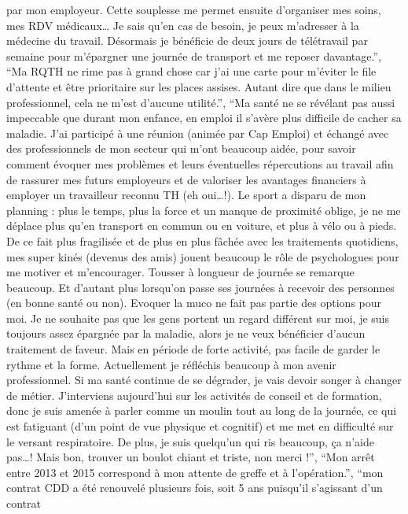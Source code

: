 \documentclass[
  letterpaper,
  DIV=11,
  numbers=noendperiod]{scrartcl}
\begin{document}
\begin{itemize}
  par mon employeur. Cette souplesse me permet ensuite d'organiser mes
  soins, mes RDV médicaux\ldots{} Je sais qu'en cas de besoin, je peux
  m'adresser à la médecine du travail. Désormais je bénéficie de deux
  jours de télétravail par semaine pour m'épargner une journée de
  transport et me reposer davantage.'', ``Ma RQTH ne rime pas à grand
  chose car j'ai une carte pour m'éviter le file d'attente et être
  prioritaire sur les places assises. Autant dire que dans le milieu
  professionnel, cela ne m'est d'aucune utilité.'', ``Ma santé ne se
  révélant pas aussi impeccable que durant mon enfance, en emploi il
  s'avère plus difficile de cacher sa maladie. J'ai participé à une
  réunion (animée par Cap Emploi) et échangé avec des professionnels de
  mon secteur qui m'ont beaucoup aidée, pour savoir comment évoquer mes
  problèmes et leurs éventuelles répercutions au travail afin de
  rassurer mes futurs employeurs et de valoriser les avantages
  financiers à employer un travailleur reconnu TH (eh oui\ldots!). Le
  sport a disparu de mon planning : plus le temps, plus la force et un
  manque de proximité oblige, je ne me déplace plus qu'en transport en
  commun ou en voiture, et plus à vélo ou à pieds. De ce fait plus
  fragilisée et de plus en plus fâchée avec les traitements quotidiens,
  mes super kinés (devenus des amis) jouent beaucoup le rôle de
  psychologues pour me motiver et m'encourager. Tousser à longueur de
  journée se remarque beaucoup. Et d'autant plus lorsqu'on passe ses
  journées à recevoir des personnes (en bonne santé ou non). Evoquer la
  muco ne fait pas partie des options pour moi. Je ne souhaite pas que
  les gens portent un regard différent sur moi, je suis toujours assez
  épargnée par la maladie, alors je ne veux bénéficier d'aucun
  traitement de faveur. Mais en période de forte activité, pas facile de
  garder le rythme et la forme. Actuellement je réfléchis beaucoup à mon
  avenir professionnel. Si ma santé continue de se dégrader, je vais
  devoir songer à changer de métier. J'interviens aujourd'hui sur les
  activités de conseil et de formation, donc je suis amenée à parler
  comme un moulin tout au long de la journée, ce qui est fatiguant (d'un
  point de vue physique et cognitif) et me met en difficulté sur le
  versant respiratoire. De plus, je suis quelqu'un qui ris beaucoup, ça
  n'aide pas\ldots! Mais bon, trouver un boulot chiant et triste, non
  merci !'', ``Mon arrêt entre 2013 et 2015 correspond à mon attente de
  greffe et à l'opération.'', ``mon contrat CDD a été renouvelé
  plusieurs fois, soit 5 ans puisqu'il s'agissant d'un contrat

\end{itemize}
\end{document}
